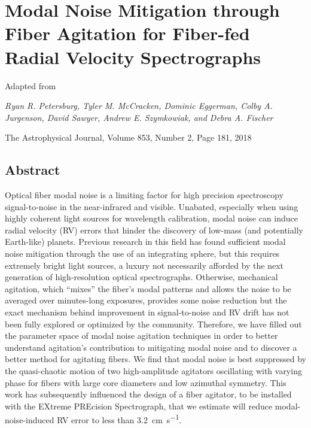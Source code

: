 \chapter{Modal Noise Mitigation through Fiber Agitation for Fiber-fed Radial Velocity Spectrographs}\label{chapter:modal-noise}

\begin{center}
    Adapted from

    \textit{Ryan R. Petersburg, Tyler M. McCracken, Dominic Eggerman, Colby A. Jurgenson, David Sawyer, Andrew E. Szymkowiak, and Debra A. Fischer}
    
    The Astrophysical Journal, Volume 853, Number 2, Page 181, 2018
\end{center}

\section*{Abstract}

Optical fiber modal noise is a limiting factor for high precision spectroscopy signal-to-noise in the near-infrared and visible. Unabated, especially when using highly coherent light sources for wavelength calibration, modal noise can induce radial velocity (RV) errors that hinder the discovery of low-mass (and potentially Earth-like) planets. Previous research in this field has found sufficient modal noise mitigation through the use of an integrating sphere, but this requires extremely bright light sources, a luxury not necessarily afforded by the next generation of high-resolution optical spectrographs. Otherwise, mechanical agitation, which ``mixes'' the fiber's modal patterns and allows the noise to be averaged over minutes-long exposures, provides some noise reduction but the exact mechanism behind improvement in signal-to-noise and RV drift has not been fully explored or optimized by the community. Therefore, we have filled out the parameter space of modal noise agitation techniques in order to better understand agitation's contribution to mitigating modal noise and to discover a better method for agitating fibers. We find that modal noise is best suppressed by the quasi-chaotic motion of two high-amplitude agitators oscillating with varying phase for fibers with large core diameters and low azimuthal symmetry. This work has subsequently influenced the design of a fiber agitator, to be installed with the EXtreme PREcision Spectrograph, that we estimate will reduce modal-noise-induced RV error to less than \SI{3.2}{\centi\meter\per\second}.


